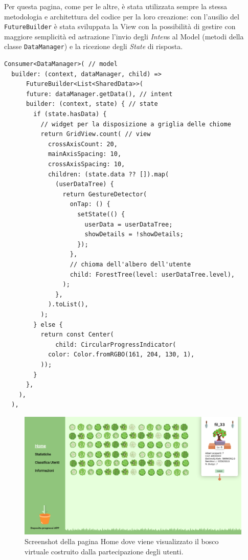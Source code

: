 Per questa pagina, come per le altre, è stata utilizzata sempre la stessa metodologia e architettura del codice per la loro creazione: con l'ausilio del \texttt{FutureBuilder} è stata sviluppata la View con la possibilità di gestire con maggiore semplicità ed astrazione l'invio degli \textit{Inten}s al Model (metodi della classe \texttt{DataManager}) e la ricezione degli \textit{State} di risposta.
\vspace{\baselineskip}
\begin{lstlisting}[style=FlutterStyle, caption={Parte del codice per la creazione del bosco della Homepage}, label={lst:homepageCode}]
  Consumer<DataManager>( // model
  builder: (context, dataManager, child) =>
      FutureBuilder<List<SharedData>>(
      future: dataManager.getData(), // intent
      builder: (context, state) { // state 
        if (state.hasData) {
          // widget per la disposizione a griglia delle chiome
          return GridView.count( // view
            crossAxisCount: 20,
            mainAxisSpacing: 10,
            crossAxisSpacing: 10,
            children: (state.data ?? []).map(
              (userDataTree) {
                return GestureDetector(
                  onTap: () {
                    setState(() {
                      userData = userDataTree;
                      showDetails = !showDetails;
                    });
                  },
                  // chioma dell'albero dell'utente
                  child: ForestTree(level: userDataTree.level),
                );
              },
            ).toList(),
          );
        } else {
          return const Center(
              child: CircularProgressIndicator(
            color: Color.fromRGBO(161, 204, 130, 1),
          ));
        }
      },
    ),
  ),
\end{lstlisting}
\begin{figure}[h!]
  \centering
  \includegraphics[width=\textwidth]{img/totem/screenshot/homepage.png}
  \caption{Screenshot della pagina Home dove viene visualizzato il bosco virtuale costruito dalla partecipazione degli utenti.}
  \label{fig:homepage}
\end{figure}
%
%
\break
